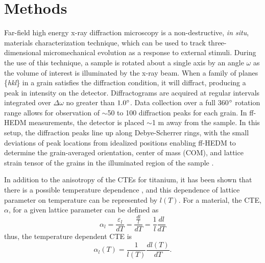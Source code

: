 \documentclass[3p]{elsarticle}
\begin{document}
\section{Methods}
	Far-field high energy x-ray dif{}fraction microscopy is a non-destructive, \textit{in situ}, materials characterization technique, which can be used to track three-dimensional micromechanical evolution as a response to external stimuli. During the use of this technique, a sample is rotated about a single axis by an angle $\omega$ as the volume of interest is illuminated by the x-ray beam. When a family of planes \{\textit{hkl}\} in a grain satisfies the dif{}fraction condition, it will dif{}fract, producing a peak in intensity on the detector. Dif{}fractograms are acquired at regular intervals integrated over $\Delta\omega$ no greater than $1.0\degree$. Data collection over a full 360$\degree$ rotation range allows for observation of $\sim$50 to 100 dif{}fraction peaks for each grain. In f{}f-HEDM measurements, the detector is placed $\sim$1 m away from the sample. In this setup, the dif{}fraction peaks line up along Debye-Scherrer rings, with the small deviations of peak locations from idealized positions enabling f{}f-HEDM to determine the grain-averaged orientation, center of mass (COM), and lattice strain tensor of the grains in the illuminated region of the sample \cite{Bernier2011,Oddershede2010, Bernier2020}. 

	In addition to the anisotropy of the CTEs for titanium, it has been shown that there is a possible temperature dependence \cite{Touloukian1975,Russell1997,Zheng2019}, and this dependence of lattice parameter on temperature can be represented by $l(T)$. For a material, the CTE, $\alpha$, for a given lattice parameter can be defined as 
		\begin{equation}
		\alpha_l = \frac{\varepsilon_l}{dT} = \frac{\frac{dl}{l}}{dT} = \frac{1}{l}\frac{dl}{dT}
		\end{equation}
	thus, the temperature dependent CTE is 
		\begin{equation} \label{eq:alphaT}
		\alpha_l(T) = \frac{1}{l(T)}\frac{dl(T)}{dT} .
		\end{equation}
	
\end{document}

